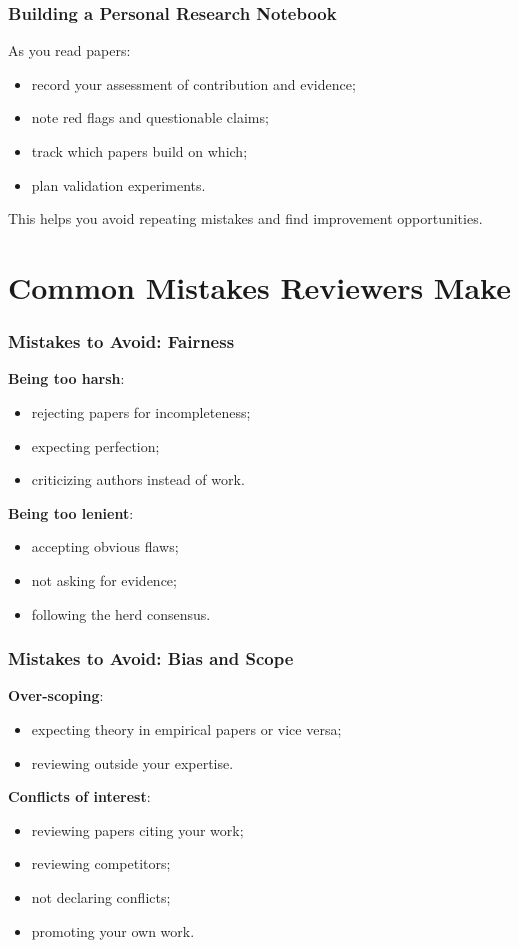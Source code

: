 \documentclass[]{beamer}
\begin{document}
\begin{frame}[fragile]
\frametitle{Building a Personal Research Notebook}
As you read papers:
\begin{itemize}
  \item record your assessment of contribution and evidence;
  \item note red flags and questionable claims;
  \item track which papers build on which;
  \item plan validation experiments.
\end{itemize}

This helps you avoid repeating mistakes and find improvement opportunities.

\end{frame}

\section{Common Mistakes Reviewers Make}

\begin{frame}[fragile]
\frametitle{Mistakes to Avoid: Fairness}
\textbf{Being too harsh}:
\begin{itemize}
  \item rejecting papers for incompleteness;
  \item expecting perfection;
  \item criticizing authors instead of work.
\end{itemize}

\textbf{Being too lenient}:
\begin{itemize}
  \item accepting obvious flaws;
  \item not asking for evidence;
  \item following the herd consensus.
\end{itemize}

\end{frame}

\begin{frame}[fragile]
\frametitle{Mistakes to Avoid: Bias and Scope}
\textbf{Over-scoping}:
\begin{itemize}
  \item expecting theory in empirical papers or vice versa;
  \item reviewing outside your expertise.
\end{itemize}

\textbf{Conflicts of interest}:
\begin{itemize}
  \item reviewing papers citing your work;
  \item reviewing competitors;
  \item not declaring conflicts;
  \item promoting your own work.
\end{itemize}

\end{frame}
\end{document}
